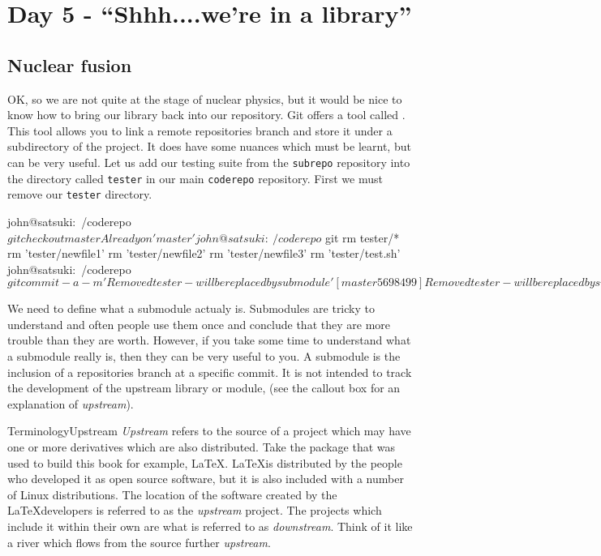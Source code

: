 \section{Day 5 - ``Shhh....we're in a library''}
\subsection{Nuclear fusion}

OK, so we are not quite at the stage of nuclear physics, but it would be nice to know how to bring our library back into our repository.
Git offers a tool called .  This tool allows you to link a remote repositories branch and store it under a subdirectory of the project.
It does have some nuances which must be learnt, but can be very useful.
Let us add our testing suite from the \texttt{subrepo} repository into the directory called \texttt{tester} in our main \texttt{coderepo} repository.
First we must remove our \texttt{tester} directory.

\begin{code}
john@satsuki:~/coderepo$ git checkout master 
Already on 'master'
john@satsuki:~/coderepo$ git rm tester/*
rm 'tester/newfile1'
rm 'tester/newfile2'
rm 'tester/newfile3'
rm 'tester/test.sh'
john@satsuki:~/coderepo$ git commit -a -m 'Removed tester - will be replaced by submodule'
[master 5698499] Removed tester - will be replaced by submodule
 4 files changed, 0 insertions(+), 20 deletions(-)
 delete mode 100644 tester/newfile1
 delete mode 100644 tester/newfile2
 delete mode 100644 tester/newfile3
 delete mode 100755 tester/test.sh
john@satsuki:~/coderepo$ 
\end{code}

We need to define what a submodule actualy is.
Submodules are tricky to understand and often people use them once and conclude that they are more trouble than they are worth.
However, if you take some time to understand what a submodule really is, then they can be very useful to you.
A submodule is the inclusion of a repositories branch at a specific commit.
It is not intended to track the development of the upstream library or module, (see the callout box for an explanation of \emph{upstream}).

\begin{callout}{Terminology}{Upstream}
\emph{Upstream} refers to the source of a project which may have one or more derivatives which are also distributed.
Take the package that was used to build this book for example, \LaTeX.
\LaTeX is distributed by the people who developed it as open source software, but it is also included with a number of Linux distributions.
The location of the software created by the \LaTeX developers is referred to as the \emph{upstream} project.
The projects which include it within their own are what is referred to as \emph{downstream}.
Think of it like a river which flows from the source further \emph{upstream}.
\end{callout}

